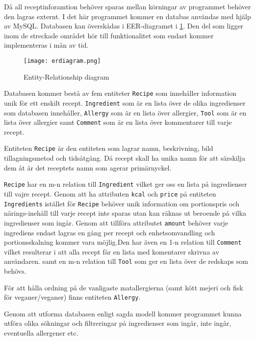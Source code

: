 Då all receptinforamtion behöver sparas mellan körningar av programmet
behöver den lagras externt. I det här programmet kommer en databas
användas med hjälp av MySQL. Databasen kan överskådas i EER-diagramet
i \ref{fig:erdiagram}. Den del som ligger inom de streckade området
hör till funktionalitet som endast kommer implementeras i mån av tid.

\begin{figure}[H]
        \centering 
        \texttt{[image: erdiagram.png]} 
        \caption{Entity-Relationship diagram} 
        \label{fig:erdiagram}
\end{figure}

Databasen kommer bestå av fem entiteter \verb+Recipe+ som innehåller
information unik för ett enskilt recept. \verb+Ingredient+ som är en
lista över de olika ingredienser som databasen
innehåller, \verb+Allergy+ som är en lista över allergier, \verb+Tool+
som är en lista över allergier samt
\verb+Comment+ som är en lista över kommentarer till varje recept.

Entiteten \verb+Recipe+ är den entiteten som lagrar namn, beskrivning,
bild tillagningsmetod och tidsåtgång. Då recept skall ha unika namn för att särskilja
dem åt är det receptets namn som agerar primärnyckel.

\verb+Recipe+ har en m-n relation till \verb+Ingredient+ vilket ger oss en
lista på ingredienser till vajre recept. Genom att ha
attributen \verb+kcal+ och \verb+price+ på
entiteten \verb+Ingredients+ istället för \verb+Recipe+ behöver unik
information om portionspris och närings-inehåll till varje recept inte
sparas utan kan räknas ut beroende på vilka ingredienser som
ingår. Genom att tillföra attributet \verb+amount+ behöver varje
ingrediens endast lagras en gång per recept och enhetsomvandling och
portionsskalning kommer vara möjlig.Den har även en 1-n relation
till \verb+Comment+ vilket resulterar i att alla recept får en lista
med komentarer skrivna av användaren. samt en m-n relation
till \verb+Tool+ som ger en lista över de redskaps som behövs.

För att hålla ordning på de vanligaste matallergierna (samt kött
mejeri och fisk för veganer/veganer) finns entiteten \verb+Allergy+.

Genom att utforma databasen enligt sagda modell kommer programmet
kunna utföra olika sökningar och filtreringar på ingredienser som
ingår, inte ingår, eventuella allergener etc.



